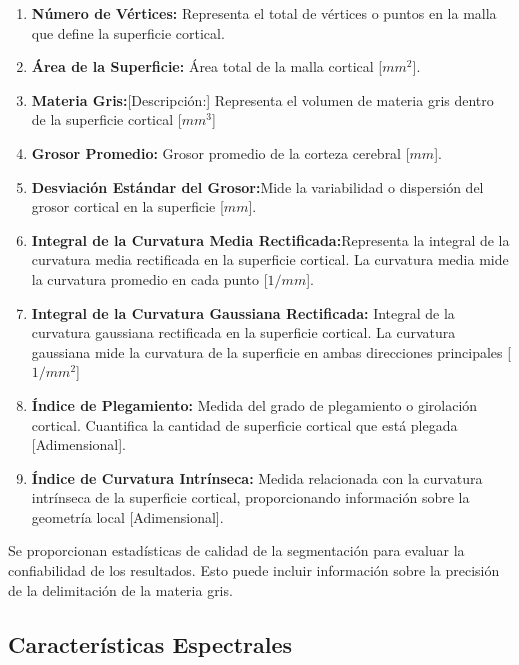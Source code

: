 \documentclass[11pt,letterpaper]{article}
\numberwithin{equation}{subsection}
\numberwithin{table}{subsection}
\begin{document}
\begin{enumerate}
    \item \textbf{Número de Vértices:} Representa el total de vértices o puntos en la malla que define la superficie cortical.

    \item \textbf{Área de la Superficie:} Área total de la malla cortical [$mm^2$]. 

    \item \textbf{Materia Gris:}[Descripción:] Representa el volumen de materia gris dentro de la superficie cortical [$mm^3$]

    \item \textbf{Grosor Promedio:} Grosor promedio de la corteza cerebral [$mm$]. 

    \item \textbf{Desviación Estándar del Grosor:}Mide la variabilidad o dispersión del grosor cortical en la superficie [$mm$].

    \item \textbf{Integral de la Curvatura Media Rectificada:}Representa la integral de la curvatura media rectificada en la superficie cortical. La curvatura media mide la curvatura promedio en cada punto [$1/mm$].

    \item \textbf{Integral de la Curvatura Gaussiana Rectificada:} Integral de la curvatura gaussiana rectificada en la superficie cortical. La curvatura gaussiana mide la curvatura de la superficie en ambas direcciones principales [$1/mm^2$] 

    \item \textbf{Índice de Plegamiento:} Medida del grado de plegamiento o girolación cortical. Cuantifica la cantidad de superficie cortical que está plegada [Adimensional].

    \item \textbf{Índice de Curvatura Intrínseca:} Medida relacionada con la curvatura intrínseca de la superficie cortical, proporcionando información sobre la geometría local [Adimensional].
\end{enumerate}

Se proporcionan estadísticas de calidad de la segmentación para evaluar la confiabilidad de los resultados. Esto puede incluir información sobre la precisión de la delimitación de la materia gris.
  

\subsection{Características Espectrales}
\end{document}
